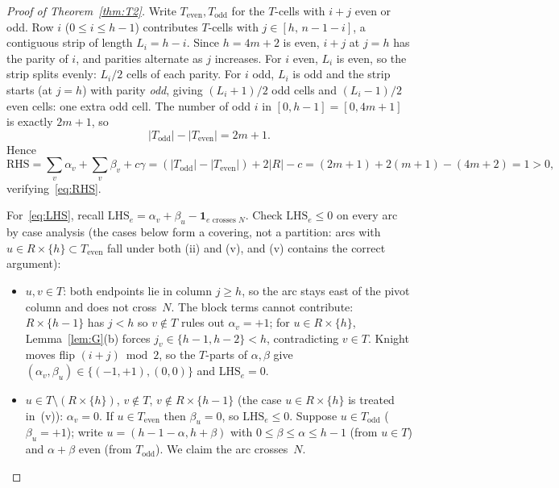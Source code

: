 \documentclass[11pt]{article}
\theoremstyle{plain}
\theoremstyle{remark}
\newcommand{\LHS}{\mathrm{LHS}}
\newcommand{\RHS}{\mathrm{RHS}}
\begin{document}
\begin{proof}[Proof of Theorem~\ref{thm:T2}]
Write $T_{\mathrm{even}}, T_{\mathrm{odd}}$ for the $T$-cells with
$i+j$ even or odd.  Row $i$ ($0\le i\le h-1$) contributes $T$-cells
with $j\in[h,\,n-1-i]$, a contiguous strip of length $L_i=h-i$.
Since $h=4m+2$ is even, $i+j$ at $j=h$ has the parity of $i$, and
parities alternate as $j$ increases.  For $i$ even, $L_i$ is even,
so the strip splits evenly:  $L_i/2$ cells of each parity.  For $i$
odd, $L_i$ is odd and the strip starts (at $j=h$) with parity
\emph{odd}, giving $(L_i+1)/2$ odd cells and $(L_i-1)/2$ even cells:
one extra odd cell.  The number of odd $i$ in $[0,h-1]=[0,4m+1]$ is
exactly $2m+1$, so
\begin{equation}\label{eq:parity}
  |T_{\mathrm{odd}}| - |T_{\mathrm{even}}| = 2m+1.
\end{equation}
Hence
\[
  \RHS = \sum_v\alpha_v + \sum_v\beta_v + c\gamma
       = (|T_{\mathrm{odd}}|-|T_{\mathrm{even}}|) + 2|R| - c
       = (2m+1)+2(m+1)-(4m+2) = 1>0,
\]
verifying~\eqref{eq:RHS}.

For~\eqref{eq:LHS}, recall
$\LHS_e = \alpha_v + \beta_u - \mathbf{1}_{e\text{ crosses }N}$.
Check $\LHS_e\le 0$ on every arc by case analysis (the cases below
form a covering, not a partition: arcs with $u\in R\times\{h\}\subset
T_{\mathrm{even}}$ fall under both (ii) and (v), and (v) contains the
correct argument):
\begin{itemize}
\item[(i)] $u,v\in T$:  both endpoints lie in column $j\ge h$, so
the arc stays east of the pivot column and does not cross~$N$.
The block terms cannot contribute:  $R\times\{h-1\}$ has $j<h$
so $v\notin T$ rules out $\alpha_v=+1$;  for $u\in R\times\{h\}$,
Lemma~\ref{lem:G}(b) forces $j_v\in\{h-1,h-2\}<h$, contradicting
$v\in T$.  Knight moves flip $(i+j)\bmod 2$, so the $T$-parts of
$\alpha,\beta$ give $(\alpha_v,\beta_u)\in\{(-1,+1),(0,0)\}$ and
$\LHS_e=0$.

\item[(ii)] $u\in T\setminus(R\times\{h\})$, $v\notin T$,
$v\notin R\times\{h-1\}$ (the case $u\in R\times\{h\}$ is treated
in~(v)):  $\alpha_v=0$.  If $u\in T_{\mathrm{even}}$ then
$\beta_u=0$, so $\LHS_e\le 0$.  Suppose $u\in T_{\mathrm{odd}}$
($\beta_u=+1$);
write $u=(h-1-\alpha,h+\beta)$ with $0\le\beta\le\alpha\le h-1$
(from $u\in T$) and $\alpha+\beta$ even (from $T_{\mathrm{odd}}$).
We claim the arc crosses~$N$.


\end{itemize}
\end{proof}
\end{document}
